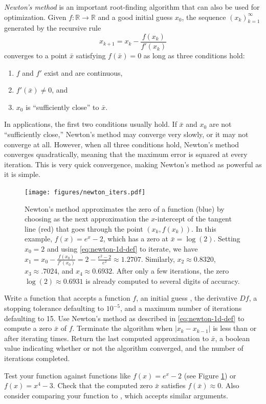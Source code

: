 \emph{Newton's method} is an important root-finding algorithm that can also be used for optimization.
Given $f:\mathbb{R}\rightarrow\mathbb{R}$ and a good initial guess $x_0$, the sequence $(x_k)_{k=1}^\infty$ generated by the recursive rule
\begin{equation}
    x_{k+1} = x_k - \frac{f(x_k)}{f'(x_k)}
    \label{eq:newton-1d-def}
\end{equation}
converges to a point $\bar{x}$ satisfying $f(\bar{x}) = 0$ as long as three conditions hold:
\begin{enumerate}
    \item $f$ and $f'$ exist and are continuous,
    \item $f'(\bar{x})\neq0$, and
    \item $x_0$ is ``sufficiently close'' to $\bar{x}$.
\end{enumerate}
In applications, the first two conditions usually hold.
If $\bar{x}$ and $x_0$ are not ``sufficiently close,'' Newton's method may converge very slowly, or it may not converge at all.
However, when all three conditions hold, Newton's method converges quadratically, meaning that the maximum error is squared at every iteration.
This is very quick convergence, making Newton's method as powerful as it is simple.


\begin{figure}[h] %
    \centering
    \texttt{[image: figures/newton\_iters.pdf]}
    \caption{
    Newton's method approximates the zero of a function (blue) by choosing as the next approximation the $x$-intercept of the tangent line (red) that goes through the point $(x_k, f(x_k))$.
    In this example, $f(x) = e^x - 2$, which has a zero at $\bar{x} = \log(2)$.
    Setting $x_0 = 2$ and using \eqref{eq:newton-1d-def} to iterate, we have $x_1 = x_0 - \frac{f(x_0)}{f'(x_0)} = 2 - \frac{e^2 - 2}{e^2} \approx 1.2707$.
    Similarly, $x_2 \approx 0.8320$, $x_3 \approx .7024$, and $x_4 \approx 0.6932$.
    After only a few iterations, the zero $\log(2)\approx 0.6931$ is already computed to several digits of accuracy.}
    \label{fig:newton}
\end{figure}
    
\begin{problem}
\label{prob:newton-basic}
Write a function that accepts a function $f$, an initial guess , the derivative $Df$, a stopping tolerance  defaulting to $10^{-5}$, and a maximum number of iterations  defaulting to 15.
Use Newton's method as described in \eqref{eq:newton-1d-def} to compute a zero $\bar{x}$ of $f$.
Terminate the algorithm when $|x_k - x_{k-1}|$ is less than  or after iterating  times.
Return the last computed approximation to $\bar{x}$, a boolean value indicating whether or not the algorithm converged, and the number of iterations completed.

Test your function against functions like $f(x) = e^x - 2$ (see Figure \ref{fig:newton}) or $f(x) = x^4 - 3$.
Check that the computed zero $\bar{x}$ satisfies $f(\bar{x}) \approx 0$.
Also consider comparing your function to , which accepts similar arguments.
\end{problem}


